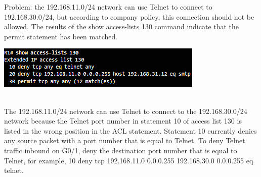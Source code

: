 \begin{example}
Problem:  the 192.168.11.0/24 network can use Telnet to connect to 192.168.30.0/24, but according to company policy, this connection should not be allowed. The results of the show access-lists 130 command indicate that the permit statement has been matched.\\
\begin{listing}
\includegraphics[scale=1]{pictures/example3.PNG} 
\end{listing}\\
The 192.168.11.0/24 network can use Telnet to connect to the 192.168.30.0/24 network because the Telnet port number in statement 10 of access list 130 is listed in the wrong position in the ACL statement. Statement 10 currently denies any source packet with a port number that is equal to Telnet. To deny Telnet traffic inbound on G0/1, deny the destination port number that is equal to Telnet, for example, 10 deny tcp 192.168.11.0 0.0.0.255 192.168.30.0 0.0.0.255 eq telnet.
\end{example}